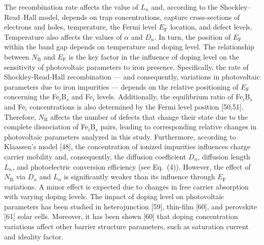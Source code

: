 \documentclass[a4paper,fleqn]{cas-sc}
\begin{document}



\begin{mdframed}
The recombination rate affects the value of $L_n$ and, according to the Shockley--Read--Hall model,
depends on trap concentrations, capture cross-sections of electrons and holes, temperature, the Fermi level $E_\mathrm{F}$ location, and defect levels.
Temperature also affects the values of $\alpha$ and $D_n$.
In turn, the position of $E_\mathrm{F}$ within the band gap depends on temperature and doping level.
\textcolor[rgb]{1.00,0.07,0.00}{
The relationship between $N_\mathrm{B}$ and $E_\mathrm{F}$ is the key  factor
in the influence of doping level on the sensitivity of photovoltaic parameters to iron presence.
Specifically, the rate of Shockley-Read-Hall recombination ---
and consequently, variations in photovoltaic parameters due to iron impurities ---
depends on the relative positioning of $E_\mathrm{F}$ concerning the Fe$_i$B$_s$ and Fe$_i$ levels.
Additionally, the equilibrium ratio of Fe$_i$B$_s$ and Fe$_i$ concentrations is also determined by the Fermi level position [50,51].
Therefore, $N_\mathrm{B}$ affects the number of defects that change their state due to the complete dissociation of Fe$_i$B$_s$ pairs,
leading to corresponding relative changes in photovoltaic parameters analyzed in this study.
Furthermore, according to Klaassen’s model [48],
the concentration of ionized impurities influences charge carrier mobility and, consequently, the diffusion coefficient $D_n$, diffusion length $L_n$,
and photoelectric conversion efficiency (see Eq.~(4)).
However, the effect of $N_\mathrm{B}$ via $D_n$ and $L_n$ is significantly weaker than its influence through $E_\mathrm{F}$ variations.
A minor effect is expected due to changes in free carrier absorption with varying doping levels.
The impact of doping level on photovoltaic parameters has been studied in heterojunction [59],
thin-film [60],
and perovskite [61] solar cells.
Moreover, it has been shown [60] that
doping concentration variations affect other barrier structure parameters, such as saturation current and ideality factor.}
\end{mdframed}
\end{document}
